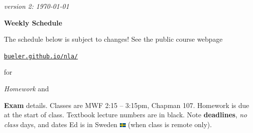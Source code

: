 \documentclass[12pt]{article}
\newcommand{\vacinline}[1]{{\color{OliveGreen} \textsl{#1}}}
\newcommand{\due}[1]{\strut {\color{BrickRed} \textsl{#1}}}
\newcommand{\ee}[1]{\strut {\color{Blue} \textbf{#1}}}
\newcommand{\dlinline}[1]{{\color{Purple} \textbf{#1}}}
\begin{document}
\hfill \small \emph{version 2: \today} \normalsize

\bigskip\bigskip
\centerline{\Large \textbf{Weekly Schedule}}

\bigskip
The schedule below is subject to changes!  See the public course webpage

\medskip

\centerline{\href{https://bueler.github.io/nla/index.html}{\texttt{bueler.github.io/nla/}}}

\noindent for \due{Homework} and \ee{Exam} details.  Classes are MWF 2:15 -- 3:15pm, Chapman 107.  Homework is due at the start of class.  Textbook lecture numbers are in black.  Note \dlinline{deadlines}, \vacinline{no class} days, and dates Ed is in Sweden \includegraphics[width=12px]{sweden.png} (when class is remote only).

\bigskip
\end{document}
